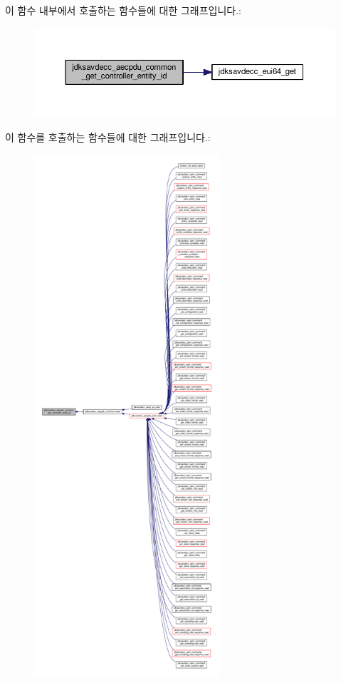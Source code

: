 이 함수 내부에서 호출하는 함수들에 대한 그래프입니다.\+:
\nopagebreak
\begin{figure}[H]
\begin{center}
\leavevmode
\includegraphics[width=350pt]{group__aecpdu__common_ga39f2e24c3c2a66121dd48a25c5c250bc_cgraph}
\end{center}
\end{figure}




이 함수를 호출하는 함수들에 대한 그래프입니다.\+:
\nopagebreak
\begin{figure}[H]
\begin{center}
\leavevmode
\includegraphics[height=550pt]{group__aecpdu__common_ga39f2e24c3c2a66121dd48a25c5c250bc_icgraph}
\end{center}
\end{figure}


